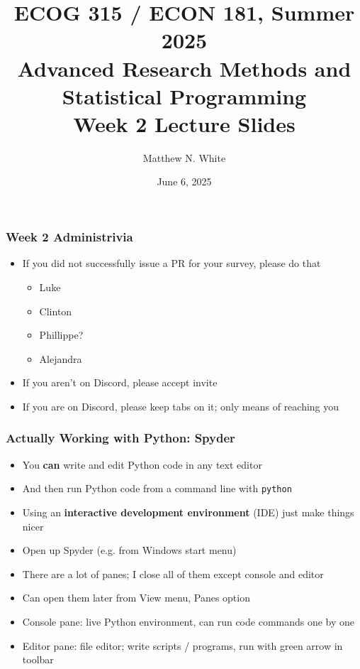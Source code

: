 \documentclass[aspectratio=169]{beamer}
\author{Matthew N. White}
\title[add]{ECOG 315 / ECON 181, Summer 2025 \\ Advanced Research Methods and Statistical Programming \\ Week 2 Lecture Slides}
\institute[HU]{Howard University}
\date{June 6, 2025}
\begin{document}
\begin{frame}
\maketitle
\end{frame}


\begin{frame}
\frametitle{Week 2 Administrivia}
	
\begin{itemize}
\item If you did not successfully issue a PR for your survey, please do that
\begin{itemize}
	\item Luke
		
	\item Clinton
		
	\item Phillippe?
		
	\item Alejandra
\end{itemize}

\item If you aren't on Discord, please accept invite

\item If you are on Discord, please keep tabs on it; only means of reaching you
\end{itemize}
	
\end{frame}


\begin{frame}
\frametitle{Actually Working with Python: Spyder}
\begin{itemize}
	\item You \textbf{can} write and edit Python code in any text editor
	
	\item And then run Python code from a command line with \texttt{python}
	
	\item <2->Using an \textbf{interactive development environment} (IDE) just make things nicer
	
	\item <2->Open up Spyder (e.g. from Windows start menu)
	
	\item <3->There are a lot of panes; I close all of them except console and editor
	
	\item <3->Can open them later from View menu, Panes option
	
	\item <4->Console pane: live Python environment, can run code commands one by one
	
	\item <4->Editor pane: file editor; write scripts / programs, run with green arrow in toolbar
\end{itemize}
\end{frame}
\end{document}
